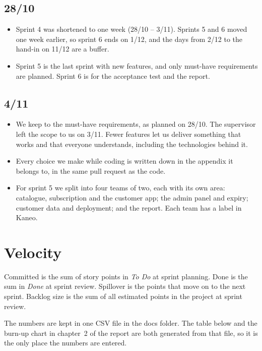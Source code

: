\documentclass[a4paper,11pt]{article}
\begin{document}
\subsection*{28/10}
\begin{itemize}
    \item Sprint 4 was shortened to one week (28/10 -- 3/11). Sprints 5 and 6 moved one week earlier, so sprint 6 ends on 1/12, and the days from 2/12 to the hand-in on 11/12 are a buffer.
    \item Sprint 5 is the last sprint with new features, and only must-have requirements are planned. Sprint 6 is for the acceptance test and the report.
\end{itemize}

\subsection*{4/11}
\begin{itemize}
    \item We keep to the must-have requirements, as planned on 28/10. The supervisor left the scope to us on 3/11. Fewer features let us deliver something that works and that everyone understands, including the technologies behind it.
    \item Every choice we make while coding is written down in the appendix it belongs to, in the same pull request as the code.
    \item For sprint 5 we split into four teams of two, each with its own area: catalogue, subscription and the customer app; the admin panel and expiry; customer data and deployment; and the report. Each team has a label in Kaneo.
\end{itemize}

\section*{Velocity}
Committed is the sum of story points in \emph{To Do} at sprint planning. Done is the sum in \emph{Done} at sprint review. Spillover is the points that move on to the next sprint. Backlog size is the sum of all estimated points in the project at sprint review.

The numbers are kept in one CSV file in the docs folder. The table below and the burn-up chart in chapter~2 of the report are both generated from that file, so it is the only place the numbers are entered.

\begin{center}
\end{center}
\end{document}
